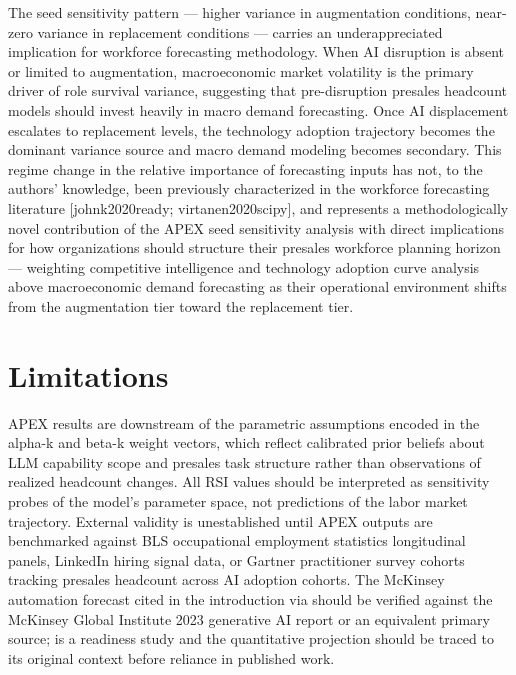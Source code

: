 \documentclass[10pt, conference]{IEEEtran}
\begin{document}
The seed sensitivity pattern --- higher variance in augmentation conditions, near-zero variance in replacement conditions --- carries an underappreciated implication for workforce forecasting methodology. When AI disruption is absent or limited to augmentation, macroeconomic market volatility is the primary driver of role survival variance, suggesting that pre-disruption presales headcount models should invest heavily in macro demand forecasting. Once AI displacement escalates to replacement levels, the technology adoption trajectory becomes the dominant variance source and macro demand modeling becomes secondary. This regime change in the relative importance of forecasting inputs has not, to the authors' knowledge, been previously characterized in the workforce forecasting literature [johnk2020ready; virtanen2020scipy], and represents a methodologically novel contribution of the APEX seed sensitivity analysis with direct implications for how organizations should structure their presales workforce planning horizon --- weighting competitive intelligence and technology adoption curve analysis above macroeconomic demand forecasting as their operational environment shifts from the augmentation tier toward the replacement tier.

\section{Limitations}

\label{sec:limitations}

APEX results are downstream of the parametric assumptions encoded in the alpha-k and beta-k weight vectors, which reflect calibrated prior beliefs about LLM capability scope and presales task structure rather than observations of realized headcount changes. All RSI values should be interpreted as sensitivity probes of the model's parameter space, not predictions of the labor market trajectory. External validity is unestablished until APEX outputs are benchmarked against BLS occupational employment statistics longitudinal panels, LinkedIn hiring signal data, or Gartner practitioner survey cohorts tracking presales headcount across AI adoption cohorts. The McKinsey automation forecast cited in the introduction via \cite{johnk2020ready} should be verified against the McKinsey Global Institute 2023 generative AI report or an equivalent primary source; \cite{johnk2020ready} is a readiness study and the quantitative projection should be traced to its original context before reliance in published work.
\end{document}
